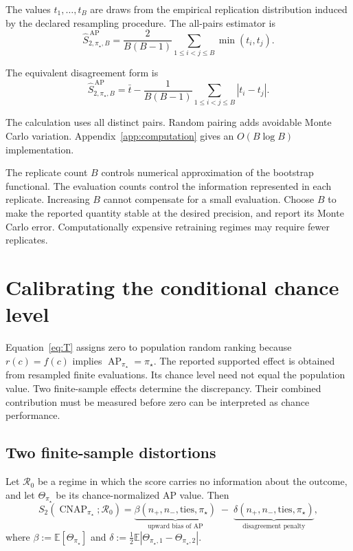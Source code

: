 \documentclass[11pt]{article}
\newcommand{\AP}{\operatorname{AP}}
\newcommand{\CNAP}{\operatorname{CNAP}}
\newcommand{\Regime}{\mathcal{R}}
\newcommand{\E}{\mathbb{E}}
\newcommand{\SAPHatB}{\widehat S_{2,\pi_\star,B}^{\,\mathrm{AP}}}
\theoremstyle{remark}
\begin{document}
The values $t_1,\ldots,t_B$ are draws from the empirical replication distribution induced by the declared resampling procedure. The all-pairs estimator is
\begin{equation}
\SAPHatB
=
\frac{2}{B(B-1)}
\sum_{1\leq i<j\leq B}
\min(t_i,t_j).
\label{eq:uestimator}
\end{equation}

The equivalent disagreement form is
\begin{equation}
\SAPHatB
=
\bar t
-
\frac{1}{B(B-1)}
\sum_{1\leq i<j\leq B}
|t_i-t_j|.
\label{eq:uestimator-disagreement}
\end{equation}

The calculation uses all distinct pairs. Random pairing adds avoidable Monte Carlo variation. Appendix~\ref{app:computation} gives an $O(B\log B)$ implementation.

The replicate count $B$ controls numerical approximation of the bootstrap functional. The evaluation counts control the information represented in each replicate. Increasing $B$ cannot compensate for a small evaluation. Choose $B$ to make the reported quantity stable at the desired precision, and report its Monte Carlo error. Computationally expensive retraining regimes may require fewer replicates.

\section{Calibrating the conditional chance level}
\label{sec:calibration}

Equation~\eqref{eq:T} assigns zero to population random ranking because $r(c)=f(c)$ implies $\AP_{\pi_\star}=\pi_\star$. The reported supported effect is obtained from resampled finite evaluations. Its chance level need not equal the population value. Two finite-sample effects determine the discrepancy. Their combined contribution must be measured before zero can be interpreted as chance performance.

\subsection{Two finite-sample distortions}

Let $\Regime_0$ be a regime in which the score carries no information about the outcome, and let $\Theta_{\pi_\star}$ be its chance-normalized AP value. Then
\begin{equation}
S_2(\CNAP_{\pi_\star};\Regime_0)
=
\underbrace{\beta(n_+,n_-,\text{ties},\pi_\star)}_{\text{upward bias of }\AP}
\;-\;
\underbrace{\delta(n_+,n_-,\text{ties},\pi_\star)}_{\text{disagreement penalty}} ,
\label{eq:two-distortions}
\end{equation}
where $\beta:=\E[\Theta_{\pi_\star}]$ and $\delta:=\tfrac12\E|\Theta_{\pi_\star,1}-\Theta_{\pi_\star,2}|$.
\end{document}
